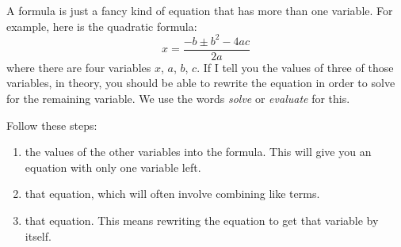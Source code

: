\documentclass[fleqn,letterpaper,12pt,printwatermark=false]{memoir}
\begin{document}


\begin{myLesson}[][]
    A formula is just a fancy kind of equation that has more than one variable.
    For example, here is the quadratic formula:
    \[
        x = 
        \frac{
            - b 
            \pm
            b^2 - 4ac
        }
        {
            2a
        }
    \]
    where there are four variables $x$, $a$, $b$, $c$.
    If I tell you the values of three of those variables,
    in theory, you should be able to rewrite the equation 
    in order to solve for the remaining variable.
    We use the words \emph{solve} or \emph{evaluate} for this.
\end{myLesson}

\begin{myKeyConcepts}
    Follow these steps:
    \begin{enumerate}
        \item {} the values of the other variables into the formula.
        This will give you an equation with only one variable left.
        \item {} that equation, which will often involve combining like terms.
        \item {} that equation. This means rewriting the equation to get that variable by itself.
    \end{enumerate}
\end{myKeyConcepts}


\end{document}
